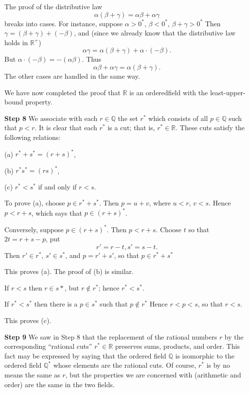 The proof of the distributive law
\begin{equation*}
    \alpha(\beta + \gamma) = \alpha\beta + \alpha\gamma
\end{equation*}
breaks into cases. For instance, suppose $\alpha> 0^*$, $\beta <0^*$, $\beta + \gamma > 0^*$ Then $\gamma = (\beta + \gamma) + (- \beta)$, and (since we already know that the distributive law holds in $\mathbb{R}^+$)
\begin{equation*}
    \alpha\gamma = \alpha(\beta+\gamma) + \alpha \cdot (-\beta).
\end{equation*}
But $\alpha \cdot (-\beta) = -(\alpha\beta)$. Thus
\begin{equation*}
    \alpha\beta + \alpha\gamma = \alpha(\beta + \gamma).
\end{equation*}
The other cases are handled in the same way.

We have now completed the proof that $\mathbb{R}$ is an orderedfield with the least-upper-bound property.

\textbf{Step 8} We associate with each $r\in \mathbb{Q}$ the set $r^*$ which consists of all $p \in \mathbb{Q}$ such that $p < r$. It is clear that each $r^*$ is a cut; that is, $r^* \in \mathbb{R}$. These cuts satisfy the following relations:

(a) $r^* + s^* = (r+s)^*$,

(b) $r^* s^* = (rs)^*$,

(c) $r^* < s^*$ if and only if $r < s$.

To prove (a), choose $p \in r^* + s^*$. Then $p=u+v$, where $u<r$, $v<s$.
Hence $p < r +s$, which says that $p \in (r + s)^*$.

Conversely, suppose $p \in (r+s)^*$. Then $p < r + s$. Choose $t$ so that
$2t = r + s - p$, put
\begin{equation*}
    r' = r - t, 
    s' = s - t.
\end{equation*}
Then $r' \in r^*$, $s' \in s^*$, and $p = r' + s'$, so that $p \in r^* + s^*$

This proves (a). The proof of (b) is similar.

If $r < s$ then $r \in s*$, but $r \not\in r^*$; hence $r^* < s^*$.

If $r^* <s^*$ then there is a $p \in s^*$ such that $p \not\in r^*$ Hence $r < p < s$, so that $r < s$.

This proves (c).

\textbf{Step 9} We saw in Step 8 that the replacement of the rational numbers $r$ by the corresponding ``rational cuts'' $r^* \in \mathbb{R}$ preserves sums, products, and order. This fact may be expressed by saying that the ordered field $\mathbb{Q}$ is isomorphic to the ordered field $\mathbb{Q}^*$ whose elements are the rational cuts. Of course, $r^*$ is by no means the same as $r$, but the properties we are concerned with (arithmetic and order) are the same in the two fields.

